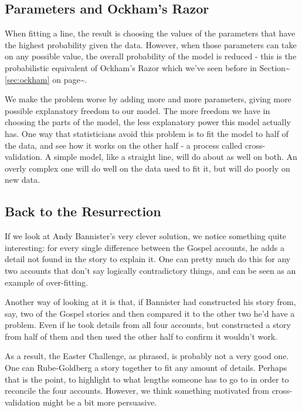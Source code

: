 \documentclass{tufte-book}
\begin{document}
\subsection{Parameters and Ockham's Razor}

When fitting a line, the result is choosing the values of the parameters
that have the highest probability given the data. However, when those
parameters can take on any possible value, the overall probability of
the model is reduced - this is the probabilistic equivalent of Ockham's
Razor which we've seen before in
Section\textasciitilde{}\ref{sec:ockham} on
page\textasciitilde{}\pageref{sec:ockham}.

We make the problem worse by adding more and more parameters, giving
more possible explanatory freedom to our model. The more freedom we have
in choosing the parts of the model, the less explanatory power this
model actually has. One way that statisticians avoid this problem is to
fit the model to half of the data, and see how it works on the other
half - a process called cross-validation. A simple model, like a
straight line, will do about as well on both. An overly complex one will
do well on the data used to fit it, but will do poorly on new data.


\subsection{Back to the Resurrection}\label{back-to-the-resurrection}

If we look at Andy Bannister's very clever solution, we notice something
quite interesting: for every single difference between the Gospel
accounts, he adds a detail not found in the story to explain it. One can
pretty much do this for any two accounts that don't say logically
contradictory things, and can be seen as an example of over-fitting.

Another way of looking at it is that, if Bannister had constructed his
story from, say, two of the Gospel stories and then compared it to the
other two he'd have a problem. Even if he took details from all four
accounts, but constructed a story from half of them and then used the
other half to confirm it wouldn't work.

As a result, the Easter Challenge, as phrased, is probably not a very
good one. One can Rube-Goldberg a story together to fit any amount of
details. Perhaps that is the point, to highlight to what lengths someone
has to go to in order to reconcile the four accounts. However, we think
something motivated from cross-validation might be a bit more
persuasive.

\backmatter



\printindex
\end{document}
